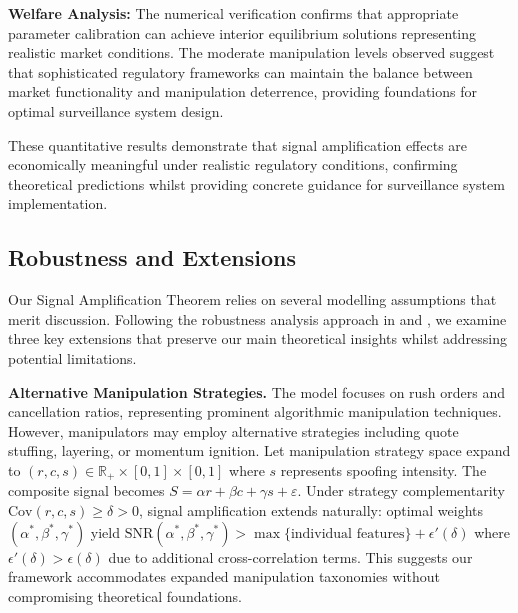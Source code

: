 \documentclass[12pt]{article}
\begin{document}
\textbf{Welfare Analysis:} The numerical verification confirms that appropriate parameter calibration can achieve interior equilibrium solutions representing realistic market conditions. The moderate manipulation levels observed suggest that sophisticated regulatory frameworks can maintain the balance between market functionality and manipulation deterrence, providing foundations for optimal surveillance system design.

These quantitative results demonstrate that signal amplification effects are economically meaningful under realistic regulatory conditions, confirming theoretical predictions whilst providing concrete guidance for surveillance system implementation.

\subsection{Robustness and Extensions}

Our Signal Amplification Theorem relies on several modelling assumptions that merit discussion. Following the robustness analysis approach in \citet{bo2023optimal} and \citet{liu2024asset}, we examine three key extensions that preserve our main theoretical insights whilst addressing potential limitations.

\textbf{Alternative Manipulation Strategies.} The model focuses on rush orders and cancellation ratios, representing prominent algorithmic manipulation techniques. However, manipulators may employ alternative strategies including quote stuffing, layering, or momentum ignition. Let manipulation strategy space expand to $(r, c, s) \in \mathbb{R}_+ \times [0,1] \times [0,1]$ where $s$ represents spoofing intensity. The composite signal becomes $S = \alpha r + \beta c + \gamma s + \varepsilon$. Under strategy complementarity $\text{Cov}(r,c,s) \geq \delta > 0$, signal amplification extends naturally: optimal weights $(\alpha^*, \beta^*, \gamma^*)$ yield $\text{SNR}(\alpha^*, \beta^*, \gamma^*) > \max\{\text{individual features}\} + \epsilon'(\delta)$ where $\epsilon'(\delta) > \epsilon(\delta)$ due to additional cross-correlation terms. This suggests our framework accommodates expanded manipulation taxonomies without compromising theoretical foundations.
\end{document}
